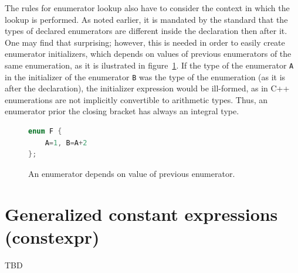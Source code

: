 \documentclass{fithesis3}
\begin{document}
The rules for enumerator lookup also have to consider the context in which the lookup is performed. As noted earlier, it is mandated by the standard that the types of declared enumerators are different inside the declaration then after it. One may find that surprising; however, this is needed in order to easily create enumerator initializers, which depends on values of previous enumerators of the same enumeration, as it is ilustrated in figure~\ref{lst:enumDepends}. If the type of the enumerator \lstinline{A} in the initializer of the enumerator \lstinline{B} was the type of the enumeration (as it is after the declaration), the initializer expression would be ill-formed, as in C++ enumerations are not implicitly convertible to arithmetic types. Thus, an enumerator prior the closing bracket has always an integral type.



\begin{figure}[ht]
\begin{lstlisting}[language=C++]
enum F {
	A=1, B=A+2
};
\end{lstlisting}
\caption{An enumerator depends on value of previous enumerator.}
\label{lst:enumDepends}
\end{figure}






\section{Generalized constant expressions (constexpr)}
TBD
\end{document}
